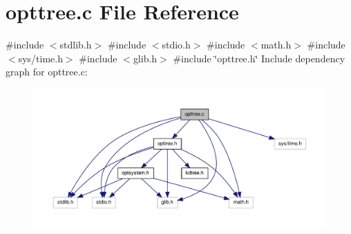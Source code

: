 \hypertarget{a00019}{\section{opttree.\-c \-File \-Reference}
\label{dd/da2/a00019}
}
{\ttfamily \#include $<$stdlib.\-h$>$}\*
{\ttfamily \#include $<$stdio.\-h$>$}\*
{\ttfamily \#include $<$math.\-h$>$}\*
{\ttfamily \#include $<$sys/time.\-h$>$}\*
{\ttfamily \#include $<$glib.\-h$>$}\*
{\ttfamily \#include \char`\"{}opttree.\-h\char`\"{}}\*
\-Include dependency graph for opttree.\-c\-:\nopagebreak
\begin{figure}[H]
\begin{center}
\leavevmode
\includegraphics[width=350pt]{df/d61/a00031}
\end{center}
\end{figure}
